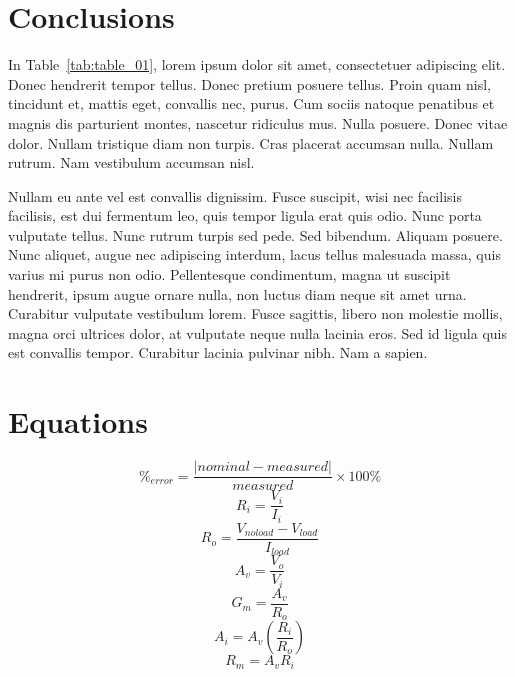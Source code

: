\documentclass{article}
\begin{document}
\section{Conclusions}
\label{sec:conclusion}

In Table~\ref{tab:table_01}, lorem ipsum dolor sit amet, consectetuer
adipiscing elit. Donec hendrerit tempor tellus. Donec pretium posuere
tellus. Proin quam nisl, tincidunt et, mattis eget, convallis nec,
purus. Cum sociis natoque penatibus et magnis dis parturient montes,
nascetur ridiculus mus. Nulla posuere. Donec vitae dolor. Nullam
tristique diam non turpis. Cras placerat accumsan nulla. Nullam
rutrum. Nam vestibulum accumsan nisl.

Nullam eu ante vel est convallis dignissim. Fusce suscipit, wisi nec
facilisis facilisis, est dui fermentum leo, quis tempor ligula erat
quis odio. Nunc porta vulputate tellus. Nunc rutrum turpis sed
pede. Sed bibendum. Aliquam posuere. Nunc aliquet, augue nec
adipiscing interdum, lacus tellus malesuada massa, quis varius mi
purus non odio. Pellentesque condimentum, magna ut suscipit hendrerit,
ipsum augue ornare nulla, non luctus diam neque sit amet
urna. Curabitur vulputate vestibulum lorem. Fusce sagittis, libero non
molestie mollis, magna orci ultrices dolor, at vulputate neque nulla
lacinia eros. Sed id ligula quis est convallis tempor. Curabitur
lacinia pulvinar nibh. Nam a sapien.

\section*{Equations}

\[\%_{error} = \frac{|nominal - measured|}{measured} \times 100\%\]
\[R_i = \frac{V_i}{I_i}\]
\[R_o = \frac{V_{noload} - V_{load}}{I_{load}}\]
\[A_v = \frac{V_o}{V_i}\]
\[G_m = \frac{A_v}{R_o}\]
\[A_i = A_v \left(\frac{R_i}{R_o}\right)\]
\[R_m = A_v R_i\]
\end{document}
